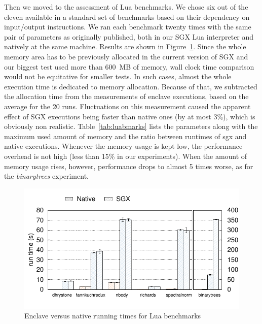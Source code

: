 Then we moved to the assessment of Lua benchmarks. 
We chose six out of the eleven available in a standard set of benchmarks \cite{bolz2015} based on their dependency on input/output instructions.
We ran each benchmark twenty times with the same pair of parameters as originally published, both in our SGX Lua interpreter and natively at the same machine. 
Results are shown in Figure~\ref{fig:luabenchs}.
Since the whole memory area has to be previously allocated in the current version of SGX and our biggest test used more than 600~MB of memory, wall clock time comparison would not be equitative for smaller tests. 
In such cases, almost the whole execution time is dedicated to memory allocation. 
Because of that, we subtracted the allocation time from the measurements of enclave executions, based on the average for the 20 runs.
Fluctuations on this measurement caused the apparent effect of SGX executions being faster than native ones (by at most 3\%), which is obviously non realistic. 
Table~\ref{tab:luabmarks} lists the parameters along with the maximum used amount of memory and the ratio between runtimes of sgx and native executions.
Whenever the memory usage is kept low, the performance overhead is not high (less than 15\% in our experiments). When the amount of memory usage rises, however, performance drops to almost 5 times worse, as for the \emph{binarytrees} experiment.

\begin{figure}[b!]
  \centering
  \includegraphics[scale=0.65]{plots/microbenchmark_luasgx/microbenchmark_luasgx.pdf}
  \caption{Enclave versus native running times for Lua benchmarks}
  \label{fig:luabenchs}
\end{figure}

